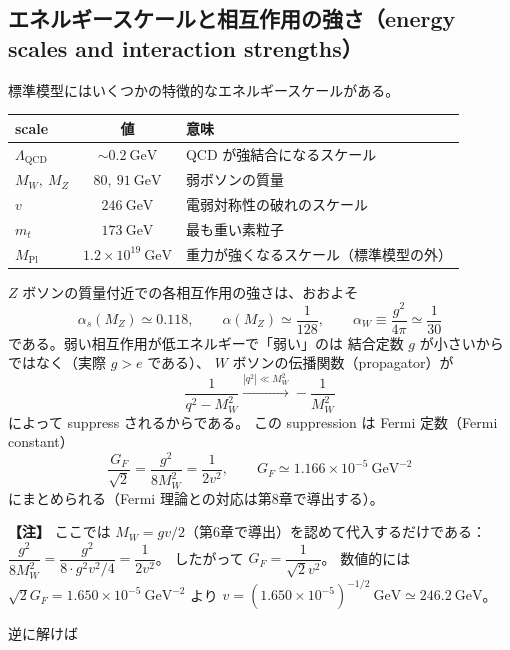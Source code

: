 \documentclass[uplatex,dvipdfmx,a4paper,11pt,openany]{jsbook}
\newcommand{\en}[1]{（#1）}
\newenvironment{note}{\vspace{1ex}\par\footnotesize\noindent\textbf{【注】}}{\par\vspace{1ex}}
\numberwithin{equation}{chapter}
\theoremstyle{definition}
\theoremstyle{plain}
\theoremstyle{remark}
\begin{document}
\subsection{エネルギースケールと相互作用の強さ（energy scales and interaction strengths）}
標準模型にはいくつかの特徴的なエネルギースケールがある。
\begin{center}
\renewcommand{\arraystretch}{1.3}
\begin{tabular}{lcl}
\toprule
scale & 値 & 意味\\
\midrule
$\Lambda_{\mathrm{QCD}}$ & $\sim0.2\ \mathrm{GeV}$ & QCD が強結合になるスケール\\
$M_W,\ M_Z$ & $80,\ 91\ \mathrm{GeV}$ & 弱ボソンの質量\\
$v$ & $246\ \mathrm{GeV}$ & 電弱対称性の破れのスケール\\
$m_t$ & $173\ \mathrm{GeV}$ & 最も重い素粒子\\
$M_{\mathrm{Pl}}$ & $1.2\times10^{19}\ \mathrm{GeV}$ & 重力が強くなるスケール（標準模型の外）\\
\bottomrule
\end{tabular}
\end{center}
$Z$ ボソンの質量付近での各相互作用の強さは、おおよそ
\begin{equation}
\alpha_s(M_Z)\simeq0.118,\qquad
\alpha(M_Z)\simeq\frac{1}{128},\qquad
\alpha_W\equiv\frac{g^2}{4\pi}\simeq\frac{1}{30}
\end{equation}
である。弱い相互作用が低エネルギーで「弱い」のは
結合定数 $g$ が小さいからではなく（実際 $g>e$ である）、
$W$ ボソンの伝播関数\en{propagator}が
\begin{equation}
\frac{1}{q^2-M_W^2}\xrightarrow{|q^2|\ll M_W^2}-\frac{1}{M_W^2}
\end{equation}
によって suppress されるからである。
この suppression は Fermi 定数\en{Fermi constant}
\begin{equation}
\frac{G_F}{\sqrt2}=\frac{g^2}{8M_W^2}=\frac{1}{2v^2},
\qquad
G_F\simeq1.166\times10^{-5}\ \mathrm{GeV}^{-2}
\label{eq:GF-preview}
\end{equation}
にまとめられる（Fermi 理論との対応は第8章で導出する）。
\begin{note}
ここでは $M_W=gv/2$（第6章で導出）を認めて代入するだけである：
$\dfrac{g^2}{8M_W^2}=\dfrac{g^2}{8\cdot g^2v^2/4}=\dfrac{1}{2v^2}$。
したがって $G_F=\dfrac{1}{\sqrt2v^2}$。
数値的には $\sqrt2G_F=1.650\times10^{-5}\ \mathrm{GeV}^{-2}$ より
$v=(1.650\times10^{-5})^{-1/2}\ \mathrm{GeV}\simeq246.2\ \mathrm{GeV}$。
\end{note}
逆に解けば
\end{document}

